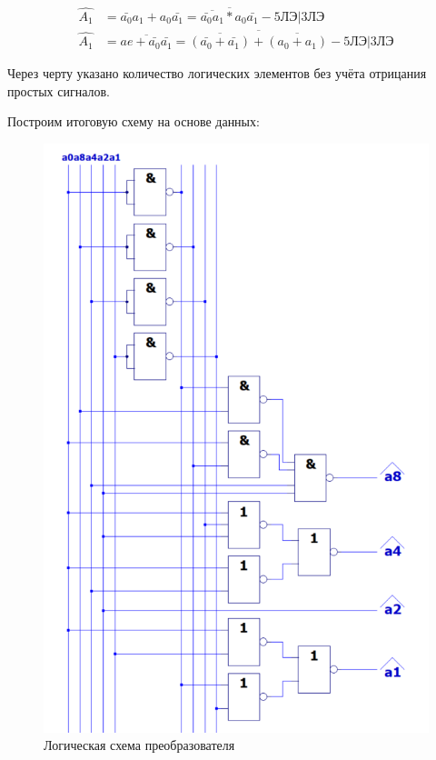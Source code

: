 \documentclass[a4paper,14pt]{article}
\begin{document}
\begin{equation*}
\begin{aligned}
\widehat{A_1} &= \bar{a_0}a_1 + a_0\bar{a_1} = \overline{\overline{\bar{a_0}a_1}*a_0\bar{a_1}} - \text{5ЛЭ|3ЛЭ} \\
\widehat{A_1} &= \overline{ae+\bar{a_0}\bar{a_1}} = \overline{\overline{(\bar{a_0}+\bar{a_1})}+\overline{(a_0+a_1)}} - \text{5ЛЭ|3ЛЭ}
\end{aligned}
\end{equation*}

Через черту указано количество логических элементов без учёта отрицания простых сигналов.

Построим итоговую схему на основе данных:

\begin{figure}[H]
	\centering
	\includegraphics[width=0.9\linewidth]{schemas/pr}
	\caption{Логическая схема преобразователя}
	\label{fig:pr}
\end{figure}
\end{document}
